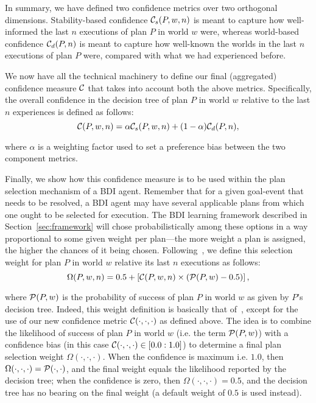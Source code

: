 In summary, we have defined two confidence metrics over two orthogonal dimensions. Stability-based confidence $\C_s(P,w,n)$ is meant to capture how well-informed the last $n$ executions of plan $P$ in world $w$ were, whereas world-based confidence $\C_d(P,n)$ is meant to capture how well-known the worlds in the last $n$ executions of plan $P$ were, compared with what we had experienced before.


We now have all the technical machinery to define our final (aggregated) confidence measure $\C$ that takes into account both the above metrics. Specifically, the overall confidence in the decision tree of plan $P$ in world $w$ relative to the last $n$ experiences is defined as follows:
\[
	\C(P,w,n) = \alpha\C_s(P,w,n) + (1-\alpha)\C_d(P,n),
\label{eqn:confidence}
\]

\noindent
where $\alpha$ is a weighting factor used to set a preference bias between the two component metrics.



Finally, we show how this confidence measure is to be used within the plan selection mechanism of a BDI agent. Remember that for a given goal-event that needs to be resolved, a BDI agent may have several applicable plans from which one ought to be selected for execution. The BDI learning framework described in Section~\ref{sec:framework} will chose probabilistically among these options in a way proportional to some given weight per plan---the more weight a plan is assigned, the higher the chances of it being chosen. 
Following~\cite{singh10:extending,singh10:learning}, we define this selection weight for plan $P$ in world $w$ relative its last $n$ executions as follows: 
\[
	\Omega(P,w,n) = 0.5 + \left[  \C(P,w,n) \times  \left( \P(P,w) - 0.5 \right)  \right],
\label{eqn:omega}   
\]

\noindent 
where $\P(P,w)$ is the probability of success of plan $P$ in world $w$ as given by $P$'s decision tree. 
%
Indeed, this weight definition is basically that of~\cite{singh10:extending,singh10:learning}, except for the use of our new confidence metric $\C(\cdot,\cdot,\cdot)$ as defined above. The idea is to combine the likelihood of success of plan $P$ in world $w$ (i.e. the term $\P(P,w)$) with a confidence bias (in this case $\C(\cdot,\cdot,\cdot) \in [0.0:1.0]$) to determine a final plan selection weight $\Omega(\cdot,\cdot,\cdot)$. 
When the confidence is maximum i.e. $1.0$, then $\Omega(\cdot,\cdot,\cdot) = \P(\cdot,\cdot)$, and the final weight equals the likelihood reported by the decision tree; when the confidence is zero, then $\Omega(\cdot,\cdot,\cdot)=0.5$, and the decision tree has no bearing on the final weight (a default weight of $0.5$ is used instead).


